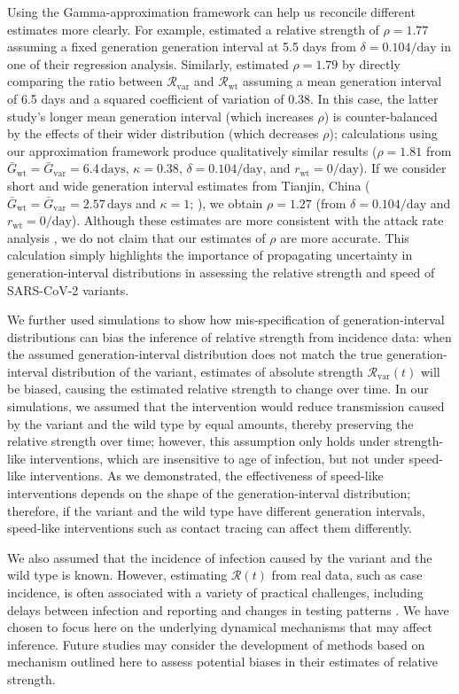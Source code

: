 \documentclass[12pt]{article}
\newcommand{\vvvar}{\mathrm{var}}
\newcommand{\wwwt}{\mathrm{wt}}
\newcommand{\rx}[1]{\ensuremath{{r}_{#1}}\xspace}
\newcommand{\rw}{\rx{\wwwt}}
\newcommand{\Rx}[1]{\ensuremath{{\mathcal R}_{#1}}\xspace}
\newcommand{\RR}{\ensuremath{{\mathcal R}}\xspace}
\newcommand{\Rw}{\Rx{\wwwt}}
\newcommand{\Rv}{\Rx{\vvvar}}
\newcommand{\days}{\ensuremath{\, \textrm{days}}}
\newcommand{\pday}{\ensuremath{/\textrm{day}}}
\newcommand{\Gx}[1]{\ensuremath{{\bar G}_{#1}}\xspace}
\newcommand{\Gw}{\Gx{\wwwt}}
\newcommand{\Gv}{\Gx{\vvvar}}
\begin{document}
Using the Gamma-approximation framework \citep{doi:10.1098/rsif.2020.0144} can help us reconcile different estimates more clearly.
For example, \cite{davies2021estimated} estimated a relative strength of $\rho=1.77$ assuming a fixed generation generation interval at 5.5 days from $\delta=0.104\pday$ in one of their regression analysis.
Similarly, \cite{volz2021transmission} estimated $\rho=1.79$ by directly comparing the ratio between $\Rv$ and $\Rw$ assuming a mean generation interval of 6.5 days and a squared coefficient of variation of 0.38.
In this case, the latter study's longer mean generation interval (which increases $\rho$) is counter-balanced by the effects of their wider distribution (which decreases $\rho$); calculations using our approximation framework produce qualitatively similar results ($\rho=1.81$ from $\Gw=\Gv=6.4\days$, $\kappa=0.38$, $\delta=0.104\pday$, and $\rw=0\pday$).
If we consider short and wide generation interval estimates from Tianjin, China ($\Gw=\Gv=2.57\days$ and $\kappa=1$; \cite{ganyani2020estimating}), we obtain $\rho=1.27$ (from $\delta=0.104\pday$ and $\rw = 0\pday$).
Although these estimates are more consistent with the attack rate analysis \citep{ukinvest},
we do not claim that our estimates of $\rho$ are more accurate.
This calculation simply highlights the importance of propagating uncertainty in generation-interval distributions in assessing the relative strength and speed of SARS-CoV-2 variants.

We further used simulations to show how mis-specification of generation-interval distributions can bias the inference of relative strength from incidence data:
when the assumed generation-interval distribution does not match the true generation-interval distribution of the variant, estimates of absolute strength $\Rv(t)$ will be biased, causing the estimated relative strength to change over time.
In our simulations, we assumed that the intervention would reduce transmission caused by the variant and the wild type by equal amounts, thereby preserving the relative strength over time;
however, this assumption only holds under strength-like interventions, which are insensitive to age of infection, but not under speed-like interventions. 
As we demonstrated, the effectiveness of speed-like interventions depends on the shape of the generation-interval distribution;
therefore, if the variant and the wild type have different generation intervals, speed-like interventions such as contact tracing can affect them differently.

We also assumed that the incidence of infection caused by the variant and the wild type is known.
However, estimating $\RR(t)$ from real data, such as case incidence, is often associated with a variety of practical challenges, including delays between infection and reporting and changes in testing patterns \citep{gostic2020practical}.
We have chosen to focus here on the underlying dynamical mechanisms that may affect inference.
Future studies may consider the development of methods based on mechanism outlined here to assess potential biases in their estimates of relative strength. 
\end{document}
